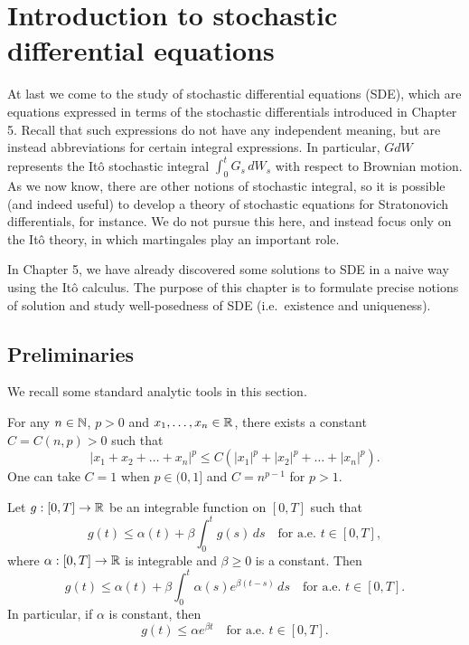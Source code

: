 \section{Introduction to stochastic differential equations}

At last we come to the study of stochastic differential equations (SDE), which are equations expressed in terms of the stochastic differentials introduced in Chapter 5. Recall that such expressions do not have any independent meaning, but are instead abbreviations for certain integral expressions. In particular, $GdW$ represents the It\^{o} stochastic integral $\int_0^t G_s\,dW_s$ with respect to Brownian motion. As we now know, there are other notions of stochastic integral, so it is possible (and indeed useful) to develop a theory of stochastic equations for Stratonovich differentials, for instance. We do not pursue this here, and instead focus only on the It\^{o} theory, in which martingales play an important role.

In Chapter 5, we have already discovered some solutions to SDE in a naive way using the It\^{o} calculus. The purpose of this chapter is to formulate precise notions of solution and study well-posedness of SDE (i.e.\ existence and uniqueness).

\subsection{Preliminaries}
We recall some standard analytic tools in this section.

\begin{exercise}
	\label{exer:convexity}
	For any $n\in\mathbb{N}$, $p>0$ and $x_1,\ldots,x_n\in\mathbb{R}$, there exists a constant $C=C(n,p)>0$ such that
	\begin{equation*}
		|x_1+x_2+\ldots+x_n|^p \le C(|x_1|^p +|x_2|^p +\ldots +|x_n|^p).
	\end{equation*}
	One can take $C=1$ when $p\in (0,1]$ and $C=n^{p-1}$ for $p>1$.
\end{exercise}

\begin{lemma}
\label{lem:gronwall}
	Let $g:[0,T]\to\mathbb{R}$ be an integrable function on $[0,T]$ such that
	\begin{equation*}
		g(t) \le \alpha(t) + \beta\int_0^t g(s)\,ds \quad\text{for a.e. } t\in [0,T],
	\end{equation*}
	where $\alpha:[0,T]\to\mathbb{R}$ is integrable and $\beta\ge 0$ is a constant. Then
	\begin{equation}
		g(t) \le \alpha(t) + \beta\int_0^t \alpha(s)e^{\beta(t-s)}\,ds \quad\text{for a.e. }t\in [0,T].
	\end{equation}
	In particular, if $\alpha$ is constant, then
	\begin{equation}
		g(t) \le \alpha e^{\beta t} \quad\text{for a.e. }t\in [0,T].
	\end{equation}
\end{lemma}

